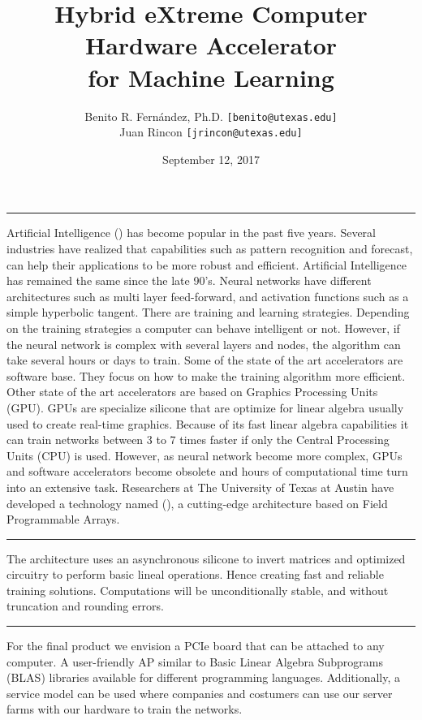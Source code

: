 \documentclass[12pt]{article}
\author{
    Benito R. Fern\'andez, Ph.D.
    \texttt{[benito@utexas.edu]}\\
    Juan Rincon \texttt{[jrincon@utexas.edu]}
    }
\title{\huge{Hybrid eXtreme Computer \cool{HxC}}\\
Hardware Accelerator\\
for Machine Learning}
\date{September 12, 2017}
\begin{document}
	\maketitle
	\vspace{10.0mm}
	\centerline{\huge\textbf{}}
    \vspace{5.0mm}
    \centerline{\LARGE\textbf{\color{red}\cool{[ P R O P R I E T A R Y ]}}}
    \clearpage
	\vspace{10mm} 
    \centerline{\Large\textbf{}}
    \vspace{2mm}\hrule
        Artificial Intelligence () has become popular in the past five years. Several industries have realized that capabilities such as pattern recognition and forecast, can help their applications to be more robust and efficient.  Artificial Intelligence has remained the same since the late 90's. Neural networks have different architectures such as multi layer feed-forward, and activation functions such as a simple hyperbolic tangent. There are training and learning strategies. Depending on the training strategies a computer can behave intelligent or not. However, if the neural network is complex with several layers and nodes, the algorithm can take several hours or days to train. Some of the state of the art accelerators are software base. They focus on how to make the training algorithm more efficient. Other state of the art accelerators are based on Graphics Processing Units (GPU). GPUs are specialize silicone that are optimize for linear algebra usually used to create real-time graphics. Because of its fast linear algebra capabilities it can train networks between 3 to 7 times faster if only the Central Processing Units (CPU) is used. However, as neural network become more complex, GPUs and software accelerators become obsolete and hours of computational time turn into an extensive task. Researchers at The University of Texas at Austin have developed a technology named (), a cutting-edge architecture based on Field Programmable Arrays. 
    \par
	\vspace{10mm} 
    \centerline{\Large\textbf{}}
    \vspace{2mm}\hrule
        The  architecture uses an asynchronous silicone to invert matrices and optimized circuitry to perform basic lineal operations. Hence creating fast and reliable training solutions. Computations will be unconditionally stable, and without truncation and rounding errors.
    \par        
	\vspace{10mm} 
    \centerline{\Large\textbf{}}
    \vspace{2mm}\hrule
    For the final product we envision a PCIe board that can be attached to any computer. A user-friendly AP similar to Basic Linear Algebra Subprograms (BLAS) libraries available for different programming languages. Additionally, a service model can be used where companies and costumers can use our server farms with our hardware to train the networks.
    
\end{document}
